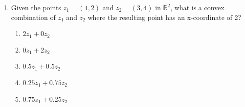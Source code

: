 \documentclass{article}%
\begin{document}
\begin{enumerate}
\begin{enumerate}
\item A convex set is a set that is always connected. This is important in linear programming because the feasible region must be a connected set.%
\item A convex set is a set that contains its boundary. This is relevant in linear programming because the boundary of the feasible region is part of the feasible region.%
\end{enumerate}%
\vspace{1em}%
\item Given the points $z_1 = (1, 2)$ and $z_2 = (3, 4)$ in $\mathbb{R}^2$, what is a convex combination of $z_1$ and $z_2$ where the resulting point has an x-coordinate of 2?%
\begin{enumerate}%
\item $2z_1 + 0z_2$%
\item $0z_1 + 2z_2$%
\item $0.5z_1 + 0.5z_2$%
\item $0.25z_1 + 0.75z_2$%
\item $0.75z_1 + 0.25z_2$%
\end{enumerate}%
\vspace{1em}%
\end{enumerate}

%
\newpage%
\end{document}
